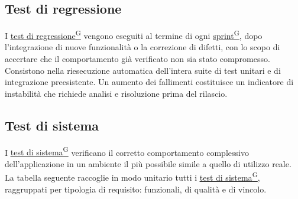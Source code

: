 \documentclass[a4paper,12pt]{article}
\providecommand{\glslink}[2]{\href{https://alittlebyte-19.github.io/Documentazione/glossario.html\#gls-#1}{\underline{#2}\textsuperscript{\scriptsize G}}}
\begin{document}
\subsection{Test di regressione}
I \glslink{test-di-regressione}{test di regressione} vengono eseguiti al termine di ogni \glslink{sprint}{sprint}, dopo l'integrazione di nuove funzionalità o la correzione di difetti, con lo scopo di accertare che il comportamento già verificato non sia stato compromesso. Consistono nella riesecuzione automatica dell'intera suite di test unitari e di integrazione preesistente. Un aumento dei fallimenti costituisce un indicatore di instabilità che richiede analisi e risoluzione prima del rilascio.

\subsection{Test di sistema}
I \glslink{test-di-sistema}{test di sistema} verificano il corretto comportamento complessivo dell'applicazione in un ambiente il più possibile simile a quello di utilizzo reale. La tabella seguente raccoglie in modo unitario tutti i \glslink{test-di-sistema}{test di sistema}, raggruppati per tipologia di requisito: funzionali, di qualità e di vincolo.
\end{document}
